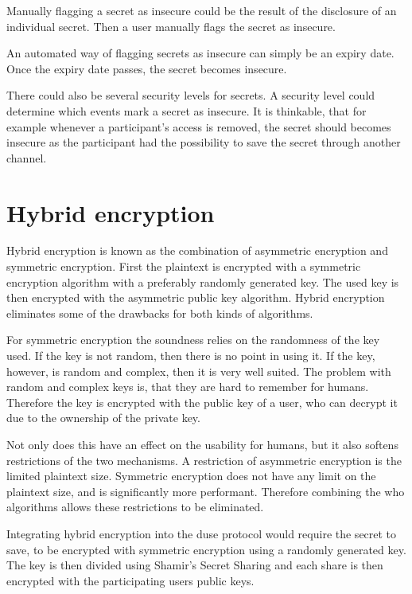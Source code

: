 Manually flagging a secret as insecure could be the result of the disclosure of
an individual secret. Then a user manually flags the secret as insecure.

An automated way of flagging secrets as insecure can simply be an expiry date.
Once the expiry date passes, the secret becomes insecure.

There could also be several security levels for secrets. A security level could
determine which events mark a secret as insecure. It is thinkable, that for
example whenever a participant's access is removed, the secret should becomes
insecure as the participant had the possibility to save the secret through
another channel.

\section{Hybrid encryption}

Hybrid encryption is known as the combination of asymmetric encryption and
symmetric encryption. First the plaintext is encrypted with a symmetric
encryption algorithm with a preferably randomly generated key. The used key is
then encrypted with the asymmetric public key algorithm. Hybrid encryption
eliminates some of the drawbacks for both kinds of algorithms. \cite{hybrid_encryption}

For symmetric encryption the soundness relies on the randomness of the key
used. If the key is not random, then there is no point in using it. If the key,
however, is random and complex, then it is very well suited. The problem with
random and complex keys is, that they are hard to remember for humans.
Therefore the key is encrypted with the public key of a user, who can decrypt
it due to the ownership of the private key.

Not only does this have an effect on the usability for humans, but it also
softens restrictions of the two mechanisms. A restriction of asymmetric
encryption is the limited plaintext size. Symmetric encryption does not have
any limit on the plaintext size, and is significantly more performant.
Therefore combining the who algorithms allows these restrictions to be
eliminated. \cite{pgp_evaluation}

Integrating hybrid encryption into the duse protocol would require the secret
to save, to be encrypted with symmetric encryption using a randomly generated
key. The key is then divided using Shamir's Secret Sharing and each share is
then encrypted with the participating users public keys.


